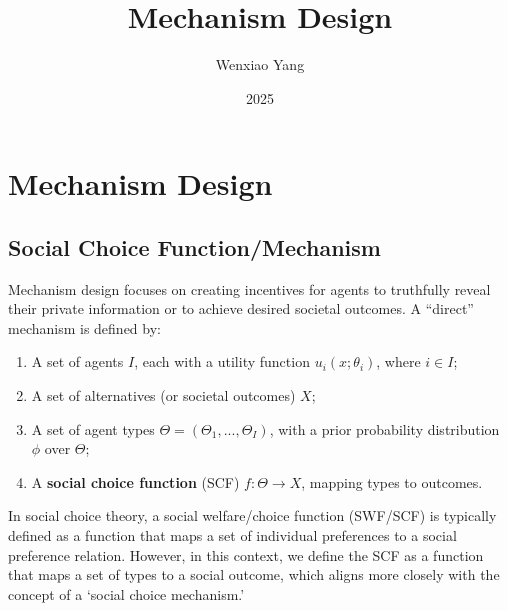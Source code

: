 \documentclass[11pt]{elegantbook_2}
\title{Mechanism Design}
\author{Wenxiao Yang}
\institute{Haas School of Business, University of California Berkeley}
\date{2025}
\begin{document}
\maketitle

\frontmatter
\tableofcontents

\mainmatter










\chapter{Mechanism Design}
\section{Social Choice Function/Mechanism}
Mechanism design focuses on creating incentives for agents to truthfully reveal their private information or to achieve desired societal outcomes. A ``direct'' mechanism is defined by:
\begin{enumerate}
    \item A set of agents $I$, each with a utility function $u_i(x;\theta_i)$, where $i \in I$;
    \item A set of alternatives (or societal outcomes) $X$;
    \item A set of agent types $\Theta=(\Theta_1,...,\Theta_I)$, with a prior probability distribution $\phi$ over $\Theta$;
    \item A \textbf{social choice function} (SCF) $f:\Theta\rightarrow X$, mapping types to outcomes.
\end{enumerate}
\begin{note}
    In social choice theory, a social welfare/choice function (SWF/SCF) is typically defined as a function that maps a set of individual preferences to a social preference relation. However, in this context, we define the SCF as a function that maps a set of types to a social outcome, which aligns more closely with the concept of a `social choice mechanism.'
\end{note}
\end{document}
